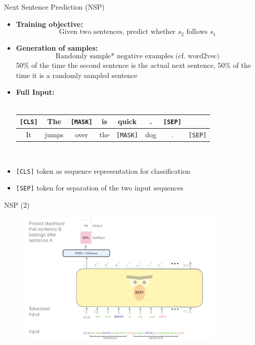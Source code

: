 
\begin{frame}{Next Sentence Prediction (NSP)}

\begin{itemize}
\item \textbf{Training objective:} $$\text{Given two sentences, predict whether $s_2$ follows $s_1$}$$
\item \textbf{Generation of samples:} $$\text{Randomly sample* negative examples (cf. word2vec)}$$
  \scriptsize *50\% of the time the second sentence is the actual next sentence, 50\% of the time it is a randomly sampled sentence
\item \normalsize \textbf{Full Input:}\\\mbox{}\\
			\footnotesize
\begin{center}
\begin{tabular}{|cccccccc|}
\hline
\cellcolor{blue!15}\texttt{[CLS]} & The & \cellcolor{blue!65}\texttt{[MASK]} & is & quick & . & \cellcolor{blue!15}\texttt{[SEP]} &\\\hline\hline It & jumps & over & the & \cellcolor{blue!65}\texttt{[MASK]} & dog & . & \cellcolor{blue!15}\texttt{[SEP]} \\
\hline
\end{tabular}\\\mbox{}
\end{center}
\item \normalsize \texttt{[CLS]} token as sequence representation for classification
\item \texttt{[SEP]} token for separation of the two input sequences
\end{itemize}

\end{frame}


\begin{frame}{NSP (2)}

\vfill

	\begin{figure}
		\centering
		\includegraphics[width = 10cm]{figure/bert-nsp.png}\\ 
	\end{figure}

\vfill

\end{frame}

